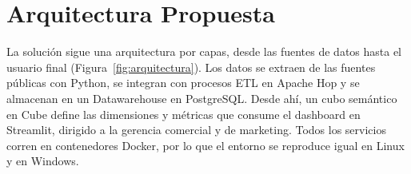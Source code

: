 \section{Arquitectura Propuesta}
\label{sec:arquitectura}

La solución sigue una arquitectura por capas, desde las fuentes de datos hasta
el usuario final (Figura~\ref{fig:arquitectura}). Los datos se extraen de las
fuentes públicas con Python, se integran con procesos ETL en Apache Hop y se
almacenan en un Datawarehouse en PostgreSQL. Desde ahí, un cubo semántico en
Cube define las dimensiones y métricas que consume el dashboard en Streamlit,
dirigido a la gerencia comercial y de marketing. Todos los servicios corren en
contenedores Docker, por lo que el entorno se reproduce igual en Linux y en
Windows.

